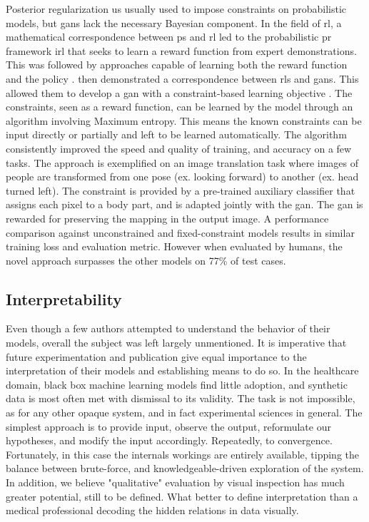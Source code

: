 Posterior regularization us usually used to impose constraints on probabilistic models, but \glspl{gan} lack the necessary Bayesian component. In the field of \gls{rl}, a mathematical correspondence between \gls{ps} and \gls{rl} led to the probabilistic \gls{pr} framework \gls{irl} that seeks to learn a reward function from expert demonstrations. This was followed by approaches capable of learning both the reward function and the policy \cite{finn2016guided,fu2018learning}. \citeauthor{Hu2018} then demonstrated a correspondence between \glspl{rl} and \glspl{gan}. This allowed them to develop a \gls{gan} with a constraint-based learning objective \cite{Hu2018}. The constraints, seen as a reward function, can be learned by the model through an algorithm involving Maximum entropy. This means the known constraints can be input directly or partially and left to be learned automatically. The algorithm consistently improved the speed and quality of training, and accuracy on a few tasks. The approach is exemplified on an image translation task where images of people are transformed from one pose (ex. looking forward) to another (ex. head turned left). The constraint is provided by a pre-trained auxiliary classifier that assigns each pixel to a body part, and is adapted jointly with the \gls{gan}. The \gls{gan} is rewarded for preserving the mapping in the output image. A performance comparison against unconstrained and fixed-constraint models results in similar training loss and evaluation metric. However when evaluated by humans, the novel approach surpasses the other models on 77\% of test cases. \par

\subsection{Interpretability\label{sec:latent-space}}
Even though a few authors attempted to understand the behavior of their models, overall the subject was left largely unmentioned. It is imperative that future experimentation and publication give equal importance to the interpretation of their models and establishing means to do so. In the healthcare domain, black box machine learning models find little adoption, and synthetic data is most often met with dismissal to its validity. The task is not impossible, as for any other opaque system, and in fact experimental sciences in general. The simplest approach is to  provide input, observe the output, reformulate our hypotheses, and modify the input accordingly. Repeatedly, to convergence. Fortunately, in this case the internals workings are entirely available, tipping the balance between brute-force, and knowledgeable-driven exploration of the system. In addition, we believe "qualitative" evaluation by visual inspection has much greater potential, still to be defined. What better to define interpretation than a medical professional decoding the hidden relations in data visually. \par


